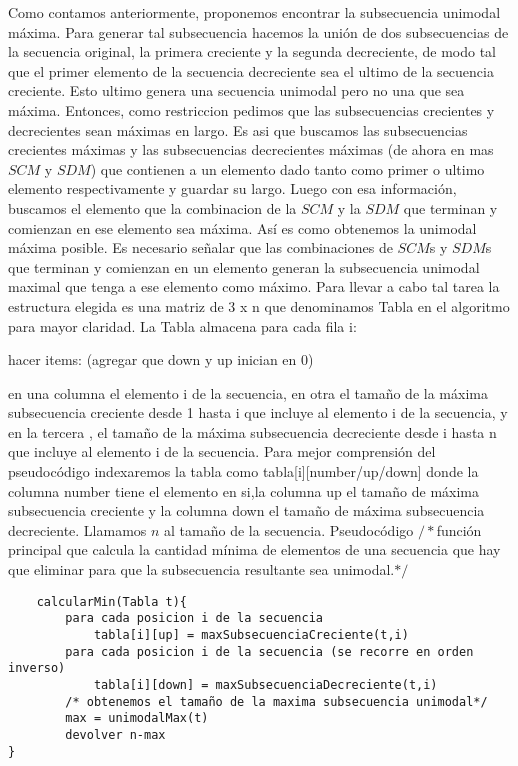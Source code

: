 Como contamos anteriormente, proponemos encontrar la subsecuencia unimodal máxima. Para generar tal subsecuencia hacemos la unión de dos subsecuencias de la secuencia original, la primera creciente y la segunda decreciente, de modo tal que el primer elemento de la secuencia decreciente sea el ultimo de la secuencia creciente. Esto ultimo genera una secuencia unimodal pero no una que sea máxima. Entonces, como restriccion pedimos que las subsecuencias crecientes y decrecientes sean máximas en largo. Es asi que buscamos las subsecuencias crecientes máximas y las subsecuencias decrecientes máximas (de ahora en mas $SCM$ y $SDM$) que contienen a un elemento dado tanto como primer o ultimo elemento respectivamente y guardar su largo. Luego con esa información, buscamos el elemento que la combinacion de la $SCM$ y la $SDM$ que terminan y comienzan en ese elemento sea máxima. Así es como obtenemos la unimodal máxima posible. Es necesario señalar que las combinaciones de $SCM$s y $SDM$s que terminan y comienzan en un elemento generan la subsecuencia unimodal maximal que tenga a ese elemento como máximo.
\newline 
Para llevar a cabo tal tarea la estructura elegida es una matriz de 3 x n que denominamos Tabla en el algoritmo para mayor claridad.
\newline
La Tabla almacena para cada fila i: 

hacer items: (agregar que down y up inician en 0)

en una columna el elemento  i de la secuencia, en otra el tamaño de la máxima subsecuencia creciente desde 1 hasta i que incluye al elemento i de la secuencia, y en la tercera , el tamaño de la máxima subsecuencia decreciente desde  i hasta n que incluye al elemento i de la secuencia.
\newline
Para mejor comprensión del pseudocódigo indexaremos la tabla como tabla[i][number/up/down] donde la columna number  tiene el elemento en si,la columna up el tamaño de máxima subsecuencia creciente y la columna down el tamaño de máxima subsecuencia decreciente. Llamamos $n$ al tamaño de la secuencia.
\newline
Pseudocódigo
\newline
$/*$función principal que calcula la cantidad mínima de elementos de una secuencia que hay que eliminar para que la subsecuencia resultante sea unimodal.$*/$
\begin{verbatim}
    calcularMin(Tabla t){
        para cada posicion i de la secuencia
            tabla[i][up] = maxSubsecuenciaCreciente(t,i)
        para cada posicion i de la secuencia (se recorre en orden inverso)
            tabla[i][down] = maxSubsecuenciaDecreciente(t,i)
        /* obtenemos el tamaño de la maxima subsecuencia unimodal*/   
        max = unimodalMax(t)     
        devolver n-max
}
\end{verbatim}

